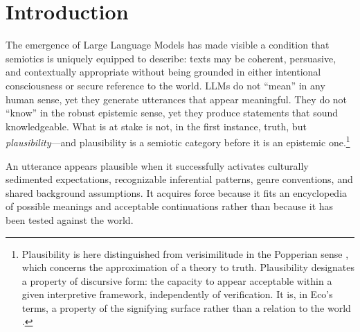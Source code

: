 \documentclass[12pt,a4paper]{article}
\begin{document}
\section{Introduction}
\label{sec:intro}

The emergence of Large Language Models has made visible a condition that
semiotics is uniquely equipped to describe: texts may be coherent, persuasive,
and contextually appropriate without being grounded in either intentional
consciousness or secure reference to the world. LLMs do not ``mean'' in any
human sense, yet they generate utterances that appear meaningful. They do not
``know'' in the robust epistemic sense, yet they produce statements that sound
knowledgeable. What is at stake is not, in the first instance, truth, but
\emph{plausibility}---and plausibility is a semiotic category before it is
an epistemic one.\footnote{Plausibility is here distinguished from
verisimilitude in the Popperian sense \citep{Popper1963}, which concerns
the approximation of a theory to truth. Plausibility designates a property
of discursive form: the capacity to appear acceptable within a given
interpretive framework, independently of verification. It is, in Eco's
terms, a property of the signifying surface rather than a relation to
the world \citep{Eco1976}.}

An utterance appears plausible when it successfully activates culturally
sedimented expectations, recognizable inferential patterns, genre conventions,
and shared background assumptions. It acquires force because it fits an
encyclopedia of possible meanings and acceptable continuations rather than
because it has been tested against the world.
\end{document}
